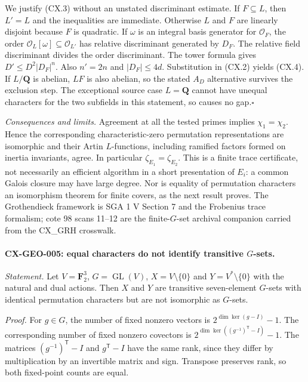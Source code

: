 \documentclass[11pt,a4paper]{article}
\begin{document}
We justify (CX.3) without an unstated discriminant estimate. If $F\subseteq L$,
then $L'=L$ and the inequalities are immediate. Otherwise $L$ and $F$ are
linearly disjoint because $F$ is quadratic. If $\omega$ is an integral basis
generator for $\mathcal O_F$, the order $\mathcal O_L[\omega]\subseteq
\mathcal O_{L'}$ has relative discriminant generated by $D_F$. The relative
field discriminant divides the order discriminant. The tower formula gives
$D'\leq D^2|D_F|^n$. Also $n'=2n$ and $|D_F|\leq4d$.
Substitution in (CX.2) yields (CX.4). If $L/\mathbf Q$ is abelian, $LF$ is
also abelian, so the stated $A_D$ alternative survives the exclusion step.
The exceptional source case $L=\mathbf Q$ cannot have unequal characters
for the two subfields in this statement, so causes no gap.\hfill$\square$

\emph{Consequences and limits.} Agreement at all the tested primes implies
$\chi_1=\chi_2$. Hence the corresponding characteristic-zero permutation
representations are isomorphic and their Artin $L$-functions, including
ramified factors formed on inertia invariants, agree. In particular
$\zeta_{E_1}=\zeta_{E_2}$. This is a finite trace certificate, not necessarily
an efficient algorithm in a short presentation of $E_i$: a common Galois
closure may have large degree. Nor is equality of permutation characters
an isomorphism theorem for finite covers, as the next result proves.
The Grothendieck framework is SGA 1 V Section 7 and the Frobenius trace
formalism; cote 98 scans 11--12 are the finite-$G$-set archival companion
carried from the CX\_GRH crosswalk.

\paragraph{CX-GEO-005: equal characters do not identify transitive $G$-sets.}
\emph{Statement.} Let $V=\mathbf F_2^3$, $G=\operatorname{GL}(V)$,
$X=V\setminus\{0\}$ and $Y=V^*\setminus\{0\}$ with the natural and dual
actions. Then $X$ and $Y$ are transitive seven-element $G$-sets with identical
permutation characters but are not isomorphic as $G$-sets.

\emph{Proof.} For $g\in G$, the number of fixed nonzero vectors is
$2^{\dim\ker(g-I)}-1$. The corresponding number of fixed nonzero covectors
is $2^{\dim\ker((g^{-1})^{\mathsf T}-I)}-1$. The matrices
$(g^{-1})^{\mathsf T}-I$ and $g^{\mathsf T}-I$ have the same rank, since
they differ by multiplication by an invertible matrix and sign. Transpose
preserves rank, so both fixed-point counts are equal.
\end{document}
